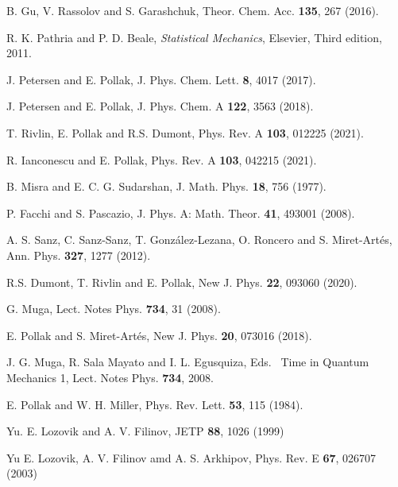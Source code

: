 \documentclass[preprint,aps]{revtex4}
\begin{document}
\begin{thebibliography}{99}
 B. Gu, V. Rassolov and S. Garashchuk, Theor. Chem. Acc.
\textbf{135}, 267 (2016).

 R. K. Pathria and P. D. Beale, {\it Statistical Mechanics}, Elsevier, Third edition, 2011.

 J. Petersen and E. Pollak, J. Phys. Chem. Lett.
\textbf{8}, 4017 (2017).

 J. Petersen and E. Pollak, J. Phys. Chem. A \textbf{%
122}, 3563 (2018).

 T. Rivlin, E. Pollak and R.S. Dumont, Phys. Rev. A
\textbf{103}, 012225 (2021).

 R. Ianconescu and E. Pollak, Phys. Rev. A 
\textbf{103}, 042215 (2021).

 B. Misra and E. C. G. Sudarshan, J. Math. Phys. {\bf 18}, 756 (1977).

 P. Facchi and S. Pascazio, J. Phys. A: Math. Theor. {\bf 41}, 493001 (2008).

 A. S. Sanz, C. Sanz-Sanz, T. Gonz\'alez-Lezana, O. Roncero and S. Miret-Art\'es, Ann. Phys. {\bf 327}, 1277 (2012).

 R.S. Dumont, T. Rivlin and E. Pollak, New J. Phys.
\textbf{22}, 093060 (2020).

 G. Muga, Lect. Notes Phys. \textbf{734}, 31 (2008).

 E. Pollak and S. Miret-Art\'es, New J. Phys. \textbf{20}, 073016 (2018).

 J. G. Muga, R. Sala Mayato and I. L. Egusquiza, Eds. {\ Time in Quantum Mechanics 1}, Lect. Notes Phys. {\bf 734}, 2008.

 E. Pollak and W. H. Miller, Phys. Rev. Lett. {\bf 53}, 115 (1984).

 Yu. E. Lozovik and A. V. Filinov, JETP {\bf 88}, 1026 (1999)

 Yu E. Lozovik, A. V. Filinov amd A. S. Arkhipov, Phys. Rev. E {\bf 67}, 026707 (2003)

\end{thebibliography}
\end{document}
